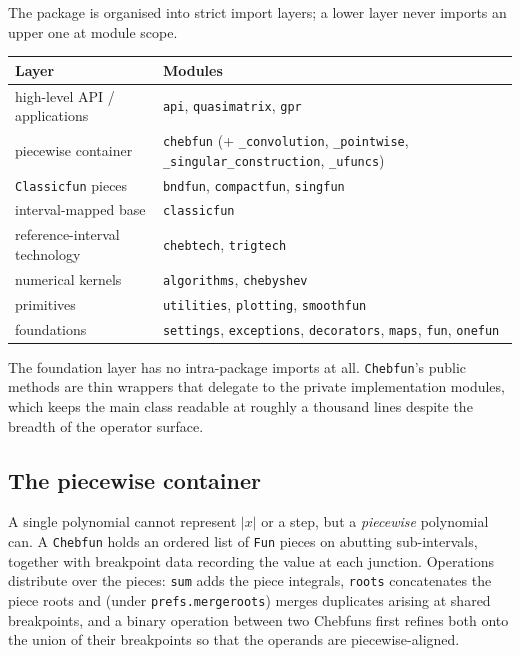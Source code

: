 \documentclass[11pt,a4paper]{article}
\newcommand{\code}[1]{\texttt{#1}}
\begin{document}
The package is organised into strict import layers; a lower layer never imports
an upper one at module scope.

\begin{center}
\small
\begin{tabular}{@{}>{\raggedright\arraybackslash}p{}
                  >{\raggedright\arraybackslash}p{}@{}}
\toprule
\textbf{Layer} & \textbf{Modules} \\
\midrule
high-level API / applications & \code{api}, \code{quasimatrix}, \code{gpr} \\
piecewise container           & \code{chebfun} (+ \code{\_convolution},
                                \code{\_pointwise},
                                \code{\_singular\_construction},
                                \code{\_ufuncs}) \\
\code{Classicfun} pieces      & \code{bndfun}, \code{compactfun},
                                \code{singfun} \\
interval-mapped base          & \code{classicfun} \\
reference-interval technology & \code{chebtech}, \code{trigtech} \\
numerical kernels             & \code{algorithms}, \code{chebyshev} \\
primitives                    & \code{utilities}, \code{plotting},
                                \code{smoothfun} \\
foundations                   & \code{settings}, \code{exceptions},
                                \code{decorators}, \code{maps},
                                \code{fun}, \code{onefun} \\
\bottomrule
\end{tabular}
\end{center}

\noindent
The foundation layer has no intra-package imports at all. \code{Chebfun}'s
public methods are thin wrappers that delegate to the private implementation
modules, which keeps the main class readable at roughly a thousand lines
despite the breadth of the operator surface.

\subsection{The piecewise container}
\label{sec:chebfun-container}

A single polynomial cannot represent $|x|$ or a step, but a \emph{piecewise}
polynomial can. A \code{Chebfun} holds an ordered list of \code{Fun} pieces on
abutting sub-intervals, together with breakpoint data recording the value at
each junction. Operations distribute over the pieces: \code{sum} adds the piece
integrals, \code{roots} concatenates the piece roots and (under
\code{prefs.mergeroots}) merges duplicates arising at shared breakpoints, and a
binary operation between two Chebfuns first refines both onto the union of
their breakpoints so that the operands are piecewise-aligned.
\end{document}
